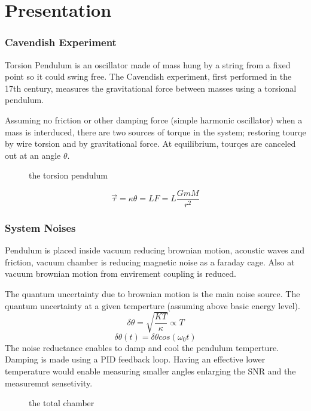 \documentclass[\main/master.tex]{subfiles}
\begin{document}
\chapter{Presentation}\label{chp:example-1}




\subsection{Cavendish Experiment}
Torsion Pendulum is an oscillator made of mass hung by a string from a fixed point so it could swing free. The Cavendish experiment, first performed in the 17th century, measures the gravitational force between masses using a torsional pendulum.
\par 
Assuming no friction or other damping force (simple harmonic oscillator) when a mass is interduced, there are two sources of torque in the system; restoring tourqe by wire torsion and by gravitational force. At equilibrium, tourqes are canceled out at an angle $\theta$.

\begin{figure}[htbp]
	\centering
	\caption[pendulum]{the torsion pendulum}
	\label{fig:torsion_pendulum}
\end{figure}
\begin{equation}
\overrightarrow{\tau} = \kappa\theta = LF = L\frac{GmM}{r^2}    \label{eqn:gravitation_tourqe}
\end{equation}
\newpage

\subsection{System Noises}
Pendulum is placed inside vacuum reducing brownian motion, acoustic waves and friction, vacuum chamber is reducing magnetic noise as a faraday cage. Also  at vacuum brownian motion from envirement coupling is reduced.
\par
The quantum uncertainty due to brownian motion is the main noise source. The quantum uncertainty at a given temperture (assuming above basic energy level).
\begin{equation}
\delta\theta = \sqrt{\frac{KT}{\kappa}}\propto{T}  \label{eqn:radiation force}
\end{equation}
\begin{equation}
\delta\theta(t) = \delta\theta cos(\omega_0 t)   \label{eqn:pid_error}
\end{equation}
The noise reductance enables to damp and cool the pendulum temperture. Damping is made using a PID feedback loop. Having an effective lower temperature would enable measuring smaller angles enlarging the SNR and the measuremnt sensetivity.
\begin{figure}[htbp]
	\centering
	\caption[total]{the total chamber}
	\label{fig:total}
\end{figure}
\end{document}
